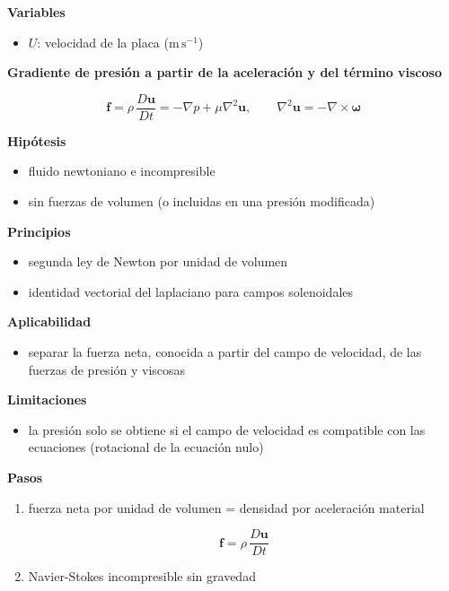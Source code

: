 \documentclass[10pt,openany]{book}
\begin{document}
\begin{tcolorbox}[title={Desarrollos del modelo}, studiumdef, breakable]
\noindent\textbf{Variables}
\begin{itemize}
\item $U$: velocidad de la placa ($\mathrm{m}\,\mathrm{s}^{-1}$)
\end{itemize}



\noindent\textbf{Gradiente de presión a partir de la aceleración y del término viscoso}

\begin{equation}
\mathbf{f} = \rho\,\frac{D\mathbf{u}}{Dt} = -\nabla p + \mu\nabla^{2}\mathbf{u},\qquad \nabla^{2}\mathbf{u} = -\nabla\times\boldsymbol{\omega}
\label{eq:c14-fuerza-presion}
\end{equation}

\noindent\textbf{Hipótesis}
\begin{itemize}
\item fluido newtoniano e incompresible
\item sin fuerzas de volumen (o incluidas en una presión modificada)
\end{itemize}

\noindent\textbf{Principios}
\begin{itemize}
\item segunda ley de Newton por unidad de volumen
\item identidad vectorial del laplaciano para campos solenoidales
\end{itemize}

\noindent\textbf{Aplicabilidad}
\begin{itemize}
\item separar la fuerza neta, conocida a partir del campo de velocidad, de las fuerzas de presión y viscosas
\end{itemize}

\noindent\textbf{Limitaciones}
\begin{itemize}
\item la presión solo se obtiene si el campo de velocidad es compatible con las ecuaciones (rotacional de la ecuación nulo)
\end{itemize}

\noindent\textbf{Pasos}
\begin{enumerate}
\item
fuerza neta por unidad de volumen = densidad por aceleración material

\[
\mathbf{f} = \rho\,\frac{D\mathbf{u}}{Dt}
\]
\item
Navier-Stokes incompresible sin gravedad


\end{enumerate}
\end{tcolorbox}
\end{document}
